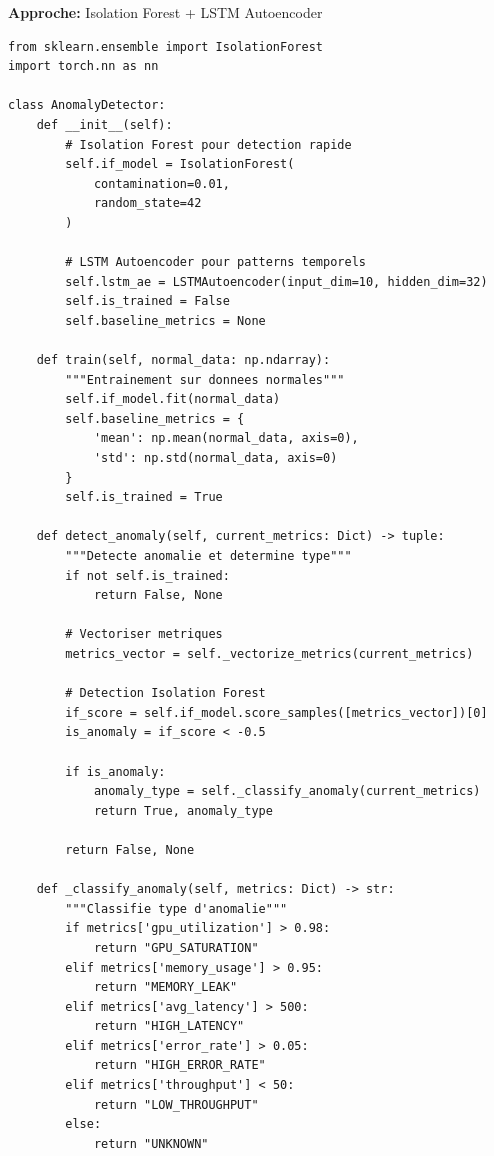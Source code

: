 \documentclass[12pt,a4paper]{article}
\begin{document}
\textbf{Approche:} Isolation Forest + LSTM Autoencoder

\begin{lstlisting}[caption={Anomaly Detection System}]
from sklearn.ensemble import IsolationForest
import torch.nn as nn

class AnomalyDetector:
    def __init__(self):
        # Isolation Forest pour detection rapide
        self.if_model = IsolationForest(
            contamination=0.01,
            random_state=42
        )
        
        # LSTM Autoencoder pour patterns temporels
        self.lstm_ae = LSTMAutoencoder(input_dim=10, hidden_dim=32)
        self.is_trained = False
        self.baseline_metrics = None
        
    def train(self, normal_data: np.ndarray):
        """Entrainement sur donnees normales"""
        self.if_model.fit(normal_data)
        self.baseline_metrics = {
            'mean': np.mean(normal_data, axis=0),
            'std': np.std(normal_data, axis=0)
        }
        self.is_trained = True
        
    def detect_anomaly(self, current_metrics: Dict) -> tuple:
        """Detecte anomalie et determine type"""
        if not self.is_trained:
            return False, None
            
        # Vectoriser metriques
        metrics_vector = self._vectorize_metrics(current_metrics)
        
        # Detection Isolation Forest
        if_score = self.if_model.score_samples([metrics_vector])[0]
        is_anomaly = if_score < -0.5
        
        if is_anomaly:
            anomaly_type = self._classify_anomaly(current_metrics)
            return True, anomaly_type
            
        return False, None
        
    def _classify_anomaly(self, metrics: Dict) -> str:
        """Classifie type d'anomalie"""
        if metrics['gpu_utilization'] > 0.98:
            return "GPU_SATURATION"
        elif metrics['memory_usage'] > 0.95:
            return "MEMORY_LEAK"
        elif metrics['avg_latency'] > 500:
            return "HIGH_LATENCY"
        elif metrics['error_rate'] > 0.05:
            return "HIGH_ERROR_RATE"
        elif metrics['throughput'] < 50:
            return "LOW_THROUGHPUT"
        else:
            return "UNKNOWN"
            

\end{lstlisting}
\end{document}
